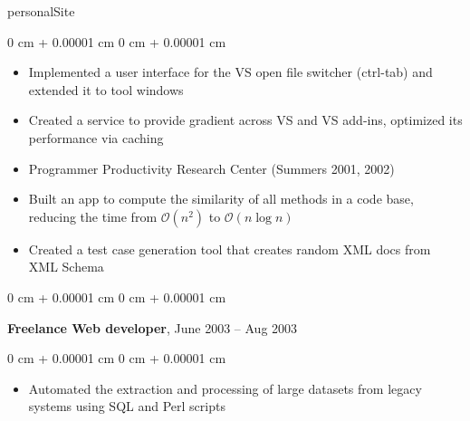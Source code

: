 personalSite\documentclass[10pt, letterpaper]{article}
\newenvironment{highlights}{
    \begin{itemize}[
        topsep=0.10 cm,
        parsep=0.10 cm,
        partopsep=0pt,
        itemsep=0pt,
        leftmargin=0 cm + 10pt
    ]
}{
    \end{itemize}
} %
\newenvironment{onecolentry}{
    \begin{adjustwidth}{
        0 cm + 0.00001 cm
    }{
        0 cm + 0.00001 cm
    }
}{
    \end{adjustwidth}
} %
\newenvironment{twocolentry}[2][]{
    \onecolentry
    \def\secondColumn{#2}
    \setcolumnwidth{\fill, 4.5 cm}
    \begin{paracol}{2}
}{
    \switchcolumn \raggedleft \secondColumn
    \end{paracol}
    \endonecolentry
} %
\begin{document}
        \vspace{0.10 cm}
        \begin{onecolentry}
            \begin{highlights}
                \item Implemented a user interface for the VS open file switcher (ctrl-tab) and extended it to tool windows
                \item Created a service to provide gradient across VS and VS add-ins, optimized its performance via caching
                \item Programmer Productivity Research Center (Summers 2001, 2002)
                \item Built an app to compute the similarity of all methods in a code base, reducing the time from $\mathcal{O}(n^2)$ to $\mathcal{O}(n \log n)$
                \item Created a test case generation tool that creates random XML docs from XML Schema
            \end{highlights}
        \end{onecolentry}


        \vspace{0.2 cm}

        \begin{twocolentry}{
            June 2003 – Aug 2003
        }
            \textbf{Freelance Web developer},\end{twocolentry}

        \vspace{0.10 cm}
        \begin{onecolentry}
            \begin{highlights}
                \item Automated the extraction and processing of large datasets from legacy systems using SQL and Perl scripts
            \end{highlights}
        \end{onecolentry}



    



        
\end{document}
